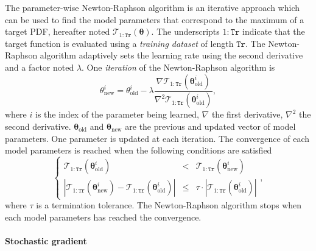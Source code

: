 The parameter-wise Newton-Raphson \cite{gelman2014bayesian} algorithm is an iterative approach which can be used to find the model parameters that correspond to the maximum of a target PDF, hereafter noted $\mathcal{T}_{1:\mathtt{Tr}}(\bm{\theta})$.
The underscripts $1:\mathtt{Tr}$ indicate that the target function is evaluated using a \emph{training dataset} of length $\mathtt{Tr}$.
The Newton-Raphson algorithm adaptively sets the learning rate using the second derivative and a factor noted $\lambda$.
One \emph{iteration} of the Newton-Raphson algorithm is
\begin{equation}
{\theta}_{\text{new}}^{i}  = {\theta}_{\text{old}}^{i} - \lambda \frac{\nabla \mathcal{T}_{1:\mathtt{Tr}}(\bm{\theta}_{\text{old}}^{i}) }{  \nabla^{2} \mathcal{T}_{1:\mathtt{Tr}}(\bm{\theta}_{\text{old}}^{i})},
\label{EQ:NR}
\end{equation}
where $i$ is the index of the parameter being learned, $\nabla$ the first derivative, $\nabla^{2}$ the second derivative.
$\bm{\theta}_{\text{old}}$ and $\bm{\theta}_{\text{new}}$ are the previous and updated vector of model parameters. 
One parameter is updated at each iteration.
The convergence of each model parameters is reached when the following conditions are satisfied
\begin{equation}
\left\{\begin{array}{ccc}
\mathcal{T}_{1:\mathtt{Tr}}(\bm\theta^{i}_{\text{old}}) &<&\mathcal{T}_{1:\mathtt{Tr}}(\bm\theta^{i}_{\text{new}})\\[4pt]
\left|\mathcal{T}_{1:\mathtt{Tr}}(\bm\theta^{i}_{\text{new}}) -  \mathcal{T}_{1:\mathtt{Tr}}(\bm\theta^{i}_{\text{old}})\right| &\leq& \tau \cdot \left|\mathcal{T}_{1:\mathtt{Tr}}(\bm\theta^{i}_{\text{old}})\right|
\end{array}\right.,
\label{EQ:STC}
\end{equation}
where $\tau$ is a termination tolerance.
The Newton-Raphson algorithm stops when each model parameters has reached the convergence.

\paragraph{Stochastic gradient}

